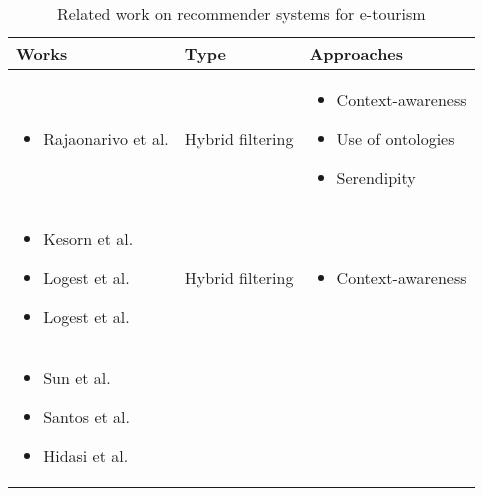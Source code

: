 \begin{table*}[h!]
    \centering
    \caption{Related work on recommender systems for e-tourism}
    \label{table:related-work}
    \begin{tabular}{ |>{\centering\arraybackslash}m{3cm}|>{\centering\arraybackslash}m{1cm}|>{\centering\arraybackslash}m{2.7cm}| } 
        \hline
        \textbf{Works} & \textbf{Type} & \textbf{Approaches} \\
        \hline

        \begin{itemize}
            \item Rajaonarivo et al. \cite{rajaonarivo2019rec}
        \end{itemize} &
        
            Hybrid filtering &

            \begin{itemize}
                \item Context-awareness
                \item Use of ontologies
                \item Serendipity
            \end{itemize}
        
        \\ \hline

        \begin{itemize}
            \item Kesorn et al. \cite{kesorn2017personalized}
            \item Logest et al. \cite{logesh2019exploring}
            \item Logest et al. \cite{logesh2018personalised}
        \end{itemize} &

            Hybrid filtering &

            \begin{itemize}
                \item Context-awareness
            \end{itemize}

        \\ \hline

        \begin{itemize}
            \item Sun et al. \cite{sun2019building}
            \item Santos et al. \cite{santos2019using}
            \item Hidasi et al. \cite{hidasi2016general}
        \end{itemize} &
            

\end{tabular}
\end{table*}
